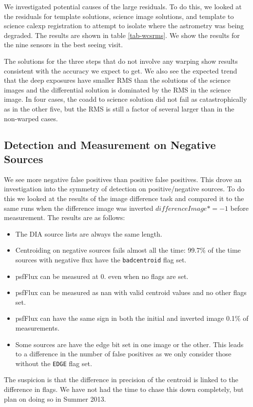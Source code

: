 \documentclass[prd, nofootinbib, floatfix, 11pt,tightenlines,times]{article}
\begin{document}
We investigated potential causes of the large residuals.  To do this, we looked at the 
residuals for template solutions, science image solutions, and template to science calexp 
registration to attempt to isolate where the astrometry was being degraded.  The results are shown
in table \ref{tab-wcsrms}.  We show the results for the nine sensors in the best seeing visit.  

The solutions for the three steps that do not involve any warping show results consistent with 
the accuracy we expect to get.  We also see the expected trend that the deep exposures have 
smaller RMS than the solutions of the science images and the differential solution is dominated
by the RMS in the science image.  In four cases, the coadd to science solution did not fail
as catastrophically as in the other five, but the RMS is still a factor of several larger
than in the non-warped cases.

\subsection{Detection and Measurement on Negative Sources}
We see more negative false positives than positive false positives.  This drove an investigation 
into the symmetry of detection on positive/negative sources.  To do this we looked at the results 
of the image difference task and compared it to the same runs when the difference image was inverted
$differenceImage *= -1$ before measurement.  The results are as follows:
\begin{itemize}
\item The DIA source lists are always the same length.
\item Centroiding on negative sources fails almost all the time: 99.7\% of the time sources with negative flux
have the {\tt badcentroid} flag set.
\item psfFlux can be measured at 0. even when no flags are set.
\item psfFlux can be measured as nan with valid centroid values and no other flags set.
\item psfFlux can have the same sign in both the initial and inverted image 0.1\% of measurements.
\item Some sources are have the edge bit set in one image or the other.  This leads to a difference in 
the number of false positives as we only consider those without the {\tt EDGE} flag set.
\end{itemize}

The suspicion is that the difference in precision of the centroid is linked to the difference in flags.
We have not had the time to chase this down completely, but plan on doing so in Summer 2013.
\end{document}

